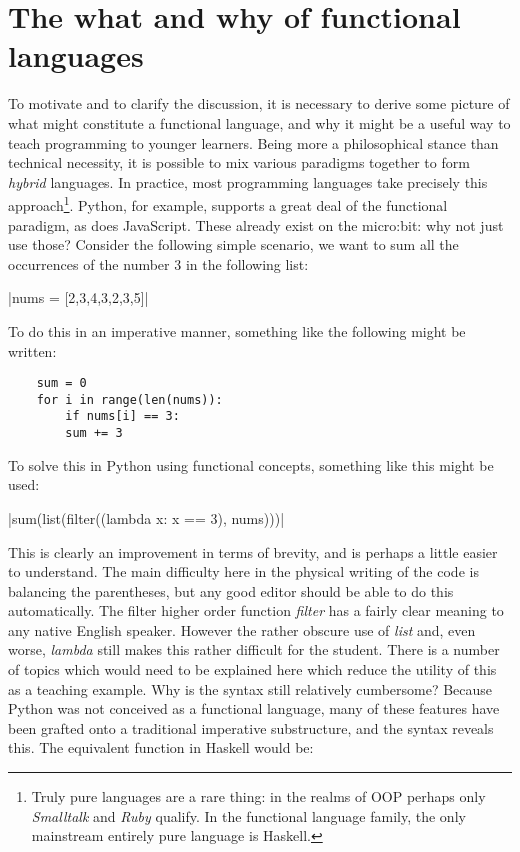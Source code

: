 \documentclass[11pt, a4paper]{article}
\begin{document}
\section{The what and why of functional languages}
To motivate and to clarify the discussion, it is necessary to derive some picture of what might
constitute a functional language, and why it might be a useful way to teach programming to younger
learners. Being more a philosophical stance than technical necessity, it is possible to mix various
paradigms together to form \textit{hybrid} languages. In practice, most programming languages take
precisely this approach\footnote{Truly pure languages are a rare thing: in the realms of OOP perhaps
only \textit{Smalltalk} and \textit{Ruby} qualify. In the functional language family, the only
mainstream entirely pure language is Haskell.}. Python, for example, supports a great deal of the 
functional paradigm, as does JavaScript. These already exist on the micro:bit: why not just use those? 
Consider the following simple scenario, we want to sum all the occurrences of the number 3 in the
following list: 

|nums = [2,3,4,3,2,3,5]|

To do this in an imperative manner, something like the following might be written:

\begin{verbatim}
    sum = 0
    for i in range(len(nums)):
        if nums[i] == 3:
        sum += 3
\end{verbatim}

To solve this in Python using functional concepts, something like this might be used:

|sum(list(filter((lambda x: x == 3), nums)))|

This is clearly an improvement in terms of brevity, and is perhaps a little easier to understand. The
main difficulty here in the physical writing of the code is balancing the parentheses, but any good
editor should be able to do this automatically. The filter
higher order function \textit{filter} has a fairly clear meaning to any native English speaker.
However the rather obscure use of \textit{list} and, even worse, \textit{lambda} still makes
this rather difficult for the student. There is a number of topics which would need to be explained
here which reduce the utility of this as a teaching example. Why is the syntax still relatively
cumbersome? Because Python was not conceived as a functional language, many of these features have
been grafted onto a traditional imperative substructure, and the syntax reveals this.
The equivalent function in Haskell would be:
\end{document}
